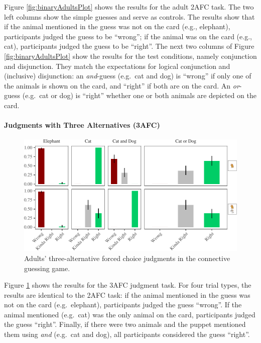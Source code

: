 \documentclass[man]{apa6}
\theoremstyle{definition}
\theoremstyle{definition}
\theoremstyle{definition}
\theoremstyle{remark}
\begin{document}
Figure \ref{fig:binaryAdultsPlot} shows the results for the adult 2AFC
task. The two left columns show the simple guesses and serve as
controls. The results show that if the animal mentioned in the guess was
not on the card (e.g., elephant), participants judged the guess to be
\enquote{wrong}; if the animal was on the card (e.g., cat), participants
judged the guess to be \enquote{right}. The next two columns of Figure
\ref{fig:binaryAdultsPlot} show the results for the test conditions,
namely conjunction and disjunction. They match the expectations for
logical conjunction and (inclusive) disjunction: an \emph{and}-guess
(e.g.~cat and dog) is \enquote{wrong} if only one of the animals is
shown on the card, and \enquote{right} if both are on the card. An
\emph{or}-guess (e.g.~cat or dog) is \enquote{right} whether one or both
animals are depicted on the card.

\paragraph{Judgments with Three Alternatives
(3AFC)}\label{judgments-with-three-alternatives-3afc}

\begin{figure}[t]

{\centering \includegraphics{figs/ternaryAdultsPlot-1} 

}

\caption{Adults' three-alternative forced choice judgments in the connective guessing game.}\label{fig:ternaryAdultsPlot}
\end{figure}

Figure \ref{fig:ternaryAdultsPlot} shows the results for the 3AFC
judgment task. For four trial types, the results are identical to the
2AFC task: if the animal mentioned in the guess was not on the card
(e.g.~elephant), participants judged the guess \enquote{wrong}. If the
animal mentioned (e.g.~cat) was the only animal on the card,
participants judged the guess \enquote{right}. Finally, if there were
two animals and the puppet mentioned them using \emph{and} (e.g.~cat and
dog), all participants considered the guess \enquote{right}.
\end{document}
